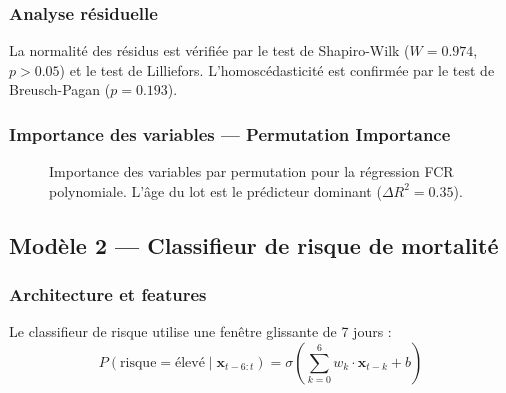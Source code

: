 \subsubsection{Analyse résiduelle}

La normalité des résidus est vérifiée par le test de Shapiro-Wilk
($W = 0.974$, $p > 0.05$) et le test de Lilliefors.
L'homoscédasticité est confirmée par le test de Breusch-Pagan ($p = 0.193$).

\subsubsection{Importance des variables --- Permutation Importance}

\begin{figure}[H]
\centering
{}
\caption[Importance des variables du modèle FCR]{Importance des variables par permutation pour la régression FCR polynomiale.
L'âge du lot est le prédicteur dominant ($\Delta R^2 = 0.35$).}
\label{fig:fcr_importance}
\end{figure}

\subsection{Modèle 2 --- Classifieur de risque de mortalité}

\subsubsection{Architecture et features}

Le classifieur de risque utilise une fenêtre glissante de 7 jours :
\begin{equation}
P(\text{risque} = \text{élevé} \mid \mathbf{x}_{t-6:t}) =
\sigma\left(\sum_{k=0}^{6} w_k \cdot \mathbf{x}_{t-k} + b\right)
\label{eq:mortalite}
\end{equation}

